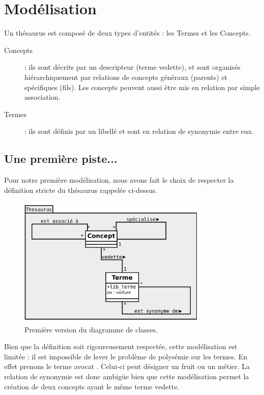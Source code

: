 \section{Modélisation} 

Un thésaurus est composé de deux types d'entités : les Termes et les Concepts.
\begin{description}
\item[Concepts] : ils sont décrits par un descripteur (terme vedette), et sont organisés hiérarchiquement par relations de concepts généraux (parents) et spécifiques (fils). Les concepts peuvent aussi être mis en relation par simple association.
\item[Termes] : ils sont définis par un libellé et sont en relation de synonymie entre eux.
\end{description}

\subsection{Une première piste...}
Pour notre première modélisation, nous avons fait le choix de respecter la définition stricte du thésaurus rappelée ci-dessus.

\begin{figure}[H]
\begin{center}
\includegraphics[width=0.8\textwidth]{files/class_v1}
\end{center}
\caption{Première version du diagramme de classes.}
\end{figure}

Bien que la définition soit rigoureusement respectée, cette modélisation est limitée : il est impossible de lever le problème de polysémie sur les termes. En effet prenons le terme \og avocat \fg. Celui-ci peut désigner un fruit ou un métier. La relation de synonymie est donc ambigüe bien que cette modélisation permet la création de deux concepts ayant le même terme vedette.

